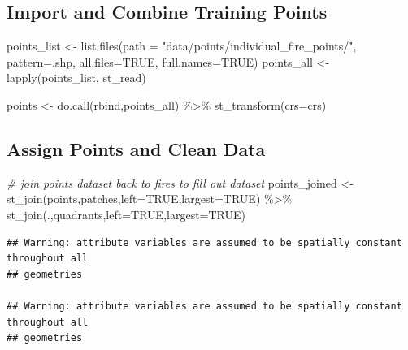 \documentclass[
]{book}
\newenvironment{Shaded}{\begin{snugshade}}{\end{snugshade}}
\newcommand{\AttributeTok}[1]{\textcolor[rgb]{0.77,0.63,0.00}{#1}}
\newcommand{\CommentTok}[1]{\textcolor[rgb]{0.56,0.35,0.01}{\textit{#1}}}
\newcommand{\ConstantTok}[1]{\textcolor[rgb]{0.00,0.00,0.00}{#1}}
\newcommand{\FunctionTok}[1]{\textcolor[rgb]{0.00,0.00,0.00}{#1}}
\newcommand{\NormalTok}[1]{#1}
\newcommand{\OtherTok}[1]{\textcolor[rgb]{0.56,0.35,0.01}{#1}}
\newcommand{\SpecialCharTok}[1]{\textcolor[rgb]{0.00,0.00,0.00}{#1}}
\newcommand{\StringTok}[1]{\textcolor[rgb]{0.31,0.60,0.02}{#1}}
\begin{document}
\hypertarget{import-and-combine-training-points}{%
\subsection{Import and Combine Training Points}\label{import-and-combine-training-points}}

\begin{Shaded}
\begin{Highlighting}[]
\NormalTok{points\_list }\OtherTok{\textless{}{-}} \FunctionTok{list.files}\NormalTok{(}\AttributeTok{path =} \StringTok{"data/points/individual\_fire\_points/"}\NormalTok{, }\AttributeTok{pattern=}\StringTok{\textquotesingle{}.shp\textquotesingle{}}\NormalTok{, }\AttributeTok{all.files=}\ConstantTok{TRUE}\NormalTok{, }\AttributeTok{full.names=}\ConstantTok{TRUE}\NormalTok{)}
\NormalTok{points\_all }\OtherTok{\textless{}{-}} \FunctionTok{lapply}\NormalTok{(points\_list, st\_read)}

\NormalTok{points }\OtherTok{\textless{}{-}} \FunctionTok{do.call}\NormalTok{(rbind,points\_all) }\SpecialCharTok{\%\textgreater{}\%} 
  \FunctionTok{st\_transform}\NormalTok{(}\AttributeTok{crs=}\NormalTok{crs)}
\end{Highlighting}
\end{Shaded}

\hypertarget{assign-points-and-clean-data}{%
\subsection{Assign Points and Clean Data}\label{assign-points-and-clean-data}}

\begin{Shaded}
\begin{Highlighting}[]
\CommentTok{\# join points dataset back to fires to fill out dataset}
\NormalTok{points\_joined }\OtherTok{\textless{}{-}} \FunctionTok{st\_join}\NormalTok{(points,patches,}\AttributeTok{left=}\ConstantTok{TRUE}\NormalTok{,}\AttributeTok{largest=}\ConstantTok{TRUE}\NormalTok{) }\SpecialCharTok{\%\textgreater{}\%} 
  \FunctionTok{st\_join}\NormalTok{(.,quadrants,}\AttributeTok{left=}\ConstantTok{TRUE}\NormalTok{,}\AttributeTok{largest=}\ConstantTok{TRUE}\NormalTok{)}
\end{Highlighting}
\end{Shaded}

\begin{verbatim}
## Warning: attribute variables are assumed to be spatially constant throughout all
## geometries

## Warning: attribute variables are assumed to be spatially constant throughout all
## geometries
\end{verbatim}
\end{document}
